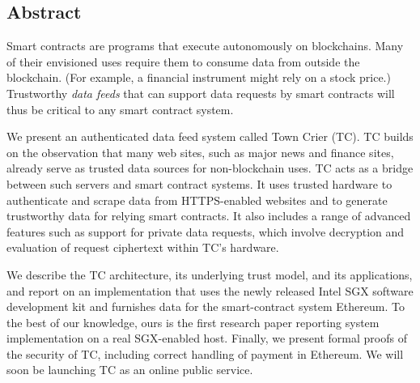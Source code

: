 \subsection*{Abstract}
Smart contracts are programs that execute autonomously on blockchains. Many of their envisioned uses require them to consume data from outside the blockchain. (For example, a financial instrument might rely on a stock price.) Trustworthy {\em data feeds} that can support data requests by smart contracts will thus be critical to any smart contract system. 

	We present an authenticated data feed system called Town Crier (TC). TC builds on the observation that many web sites, such as major news and finance sites, already serve as trusted data sources for non-blockchain uses. TC acts as a bridge between such servers and smart contract systems. It uses trusted hardware to authenticate and scrape data from HTTPS-enabled websites and to generate trustworthy data for relying smart contracts. It also includes a range of advanced features such as support for private data requests, which involve decryption and evaluation of request ciphertext  within TC's hardware.
	
	We describe the TC architecture, its underlying trust model, and its applications, and report on an implementation that uses the newly released Intel SGX software development kit and furnishes data for the smart-contract system Ethereum.  To the best of our knowledge, ours is the first research paper reporting system implementation on a real SGX-enabled host. Finally, we present formal proofs of the security of TC, including correct handling of payment in Ethereum. We will soon be launching TC as an online public service.
